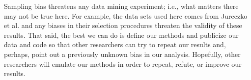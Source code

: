 \documentclass{sig-alternate}
\newcommand{\fig}[1]{Figure~\ref{fig:#1}}
\theoremstyle{break}
\begin{document}
\begin{itemize}
Sampling bias threatens any data mining experiment; i.e., what matters
there may not be true here. For example, the data sets used here comes from Jureczko et al. and any biases in their selection procedures
threaten the validity of these results. 
That said,
the best we can do is define our methods and publicize our data and code so that other researchers can
try to repeat our results and, perhaps, point out a previously unknown bias
in our analysis. Hopefully, other researchers will emulate our methods in
order to repeat, refute, or improve our results. 








 


\end{itemize}
\end{document}

